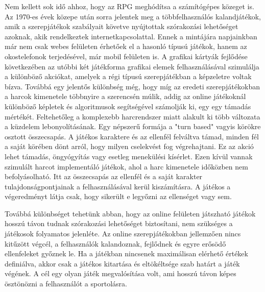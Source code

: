 
Nem kellett sok idő ahhoz, hogy az RPG meghódítsa a számítógépes közeget is. 
Az 1970-es évek közepe után sorra jelentek meg a többfelhasználós kalandjátékok, amik a szerepjátékok szabályait követve nyújtottak szórakozási lehetőséget azoknak, akik rendelkeztek internetkapcsolattal. 
Ennek a mintájára napjainkban már nem csak webes felületen érhetőek el a hasonló típusú játékok, hanem az okostelefonok terjedésével, már mobil felületen is. 
A grafikai kártyák fejlődése következében az utóbbi két játékforma grafikai elemek felhasználásával szimulálja a különböző akciókat, amelyek a régi típusú szerepjátékban a képzeletre voltak bízva. 
Továbbá egy jelentős különbség még, hogy míg az eredeti szerepjátékokban a harcok kimenetele többnyire a szerencsén múlik, addig az online játékoknál különböző képletek és algoritmusok segítségével számolják ki, egy egy támadás mértékét. 
Feltehetőleg a komplexebb harcrendszer miatt alakult ki több változata a küzdelem lebonyolításának. 
Egy népszerű formája a "turn based" vagyis körökre osztott összecsapás. 
A játékos karaktere és az ellenfél felváltva támad, minden fél a saját körében dönt arról, hogy milyen cselekvést fog végrehajtani. 
Ez az akció lehet támadás, öngyógyítás vagy esetleg menekülési kísérlet. 
Ezen kívül vannak szimulált harcot implementáló játékok, ahol a harc kimenetele időközben nem befolyásolható.
Itt az összecsapás az ellenfél és a saját karakter tulajdonságpontjainak a felhasználásával kerül kiszámításra. 
A játékos a végeredményt látja csak, hogy sikerült e legyőzni az ellenséget vagy sem. 

Továbbá különbséget tehetünk abban, hogy az online felületen játszható játékok hosszú távon tudnak szórakozási lehetőséget biztosítani, nem szükséges a játékosok folyamatos jelenléte. 
Az online szerepjátékokban jellemzően nincs kitűzött végcél, a felhasználók kalandoznak, fejlődnek és egyre erősödő ellenfeleket győznek le. 
Ha a játékban nincsenek maximálisan elérhető értékek definiálva, akkor  csak a játékos kitartása és eltökéltsége szab határt a játék végének. 
A cél egy olyan játék megvalósítása volt, ami hosszú távon képes ösztönözni a felhasználót a sportolásra.

\newpage








